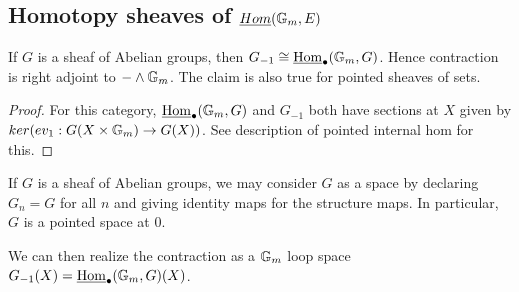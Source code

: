 \documentclass{amsart}%
\begin{document}
\subsection{Homotopy sheaves of $\underline{Hom}(\mathbb{G}_m, E)$}

\begin{proposition}
  If $G$ is a sheaf of Abelian groups, then
  $G_{-1} \cong \underline{\operatorname{Hom}}_{\bullet}(\mathbb{G}_m, G)$.  Hence
  contraction is right adjoint to $- \wedge \mathbb{G}_m$. The claim is also
  true for pointed sheaves of sets.
\end{proposition}

\begin{proof}
  For this category, $\underline{\operatorname{Hom}}_{\bullet}(\mathbb{G}_m, G)$ and
  $G_{-1}$ both have sections at $X$ given by
  $ker( ev_1 : G(X \times \mathbb{G}_m) \to G(X))$. See description of
  pointed internal hom for this. 
\end{proof}

\begin{remark}
  If $G$ is a sheaf of Abelian groups, we may consider $G$ as a space
  by declaring $G_n = G$ for all $n$ and giving identity maps for the
  structure maps. In particular, $G$ is a pointed space at $0$. 

  We can then realize the contraction as a $\mathbb{G}_m$ loop space
  $G_{-1}(X) = \underline{\operatorname{Hom}}_{\bullet}(\mathbb{G}_m,G)(X)$.
\end{remark}
\end{document}
